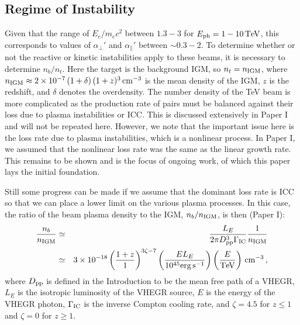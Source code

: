 \documentclass[usenatbib,iop,apj]{emulateapj}
\def\eV{{\rm eV}} %
\def\TeV{{\rm T}\eV} %
\def\erg{{\rm erg}} %
\def\cm{{\rm cm}}
\def\s{{\rm s}}
\def\GIC{\Gamma_{\rm IC}}
\def\Dpp{D_{\rm pp}}
\def\nb{n_{b}}
\def\nIGM{n_{\rm IGM}}
\begin{document}
\subsection{Regime of Instability}

Given that the range of $E_e/m_e c^2$ between $1.3-3$ for $E_{\rm ph} = 1-10\,\TeV$, this corresponds to values of $\alpha_{\perp}'$ and $\alpha_{\parallel}'$ between $\sim 0.3-2$.  To determine whether or not the reactive or kinetic instabilities apply to these beams, it is necessary to determine $n_b/n_t$.  Here the target is the background IGM, so $n_t = \nIGM$, where $\nIGM \approx 2\times 10^{-7}\,(1+\delta)\,(1+z)^3\,\cm^{-3}$ is the mean density of the IGM, $z$ is the redshift, and $\delta$ denotes the overdensity.  The number density of the TeV beam is more complicated as the production rate of pairs must be balanced against their loss due to plasma instabilities or ICC.  This is discussed extensively in Paper I and will not be repeated here.  However, we note that the important issue here is the loss rate due to plasma instabilities, which is a nonlinear process.  In Paper I, we assumed that the nonlinear loss rate was the same as the linear growth rate.  This remains to be shown and is the focus of ongoing work, of which this paper lays the initial foundation. 

Still some progress can be made if we assume that the dominant loss rate is ICC so that we can place a lower limit on the various plasma processes.  In this case, the ratio of the beam plasma density to the IGM, $n_b/\nIGM$, is then (Paper I):
\begin{eqnarray}
\frac{\nb}{\nIGM} &\simeq&
\frac{L_E}{2\pi\Dpp^3\GIC}\frac{1}{\nIGM} \nonumber\\
&\simeq &
3\times10^{-18}
\left(\frac{1+z}{1}\right)^{3\zeta-7}
\left(\frac{E L_E}{10^{45}\erg\,\s^{-1}}\right)
\left(\frac{E}{\TeV}\right)
\,\cm^{-3}\,,
\label{eq:nbIC}
\end{eqnarray}
where $\Dpp$ is defined in the Introduction to be the mean free path of a VHEGR, $L_E$ is the isotropic luminosity of the VHEGR source, $E$ is the energy of the VHEGR photon, $\Gamma_{\rm IC}$ is the inverse Compton cooling rate, and $\zeta = 4.5$ for $z \leq 1$ and $\zeta = 0$ for $z\geq 1$.
\end{document}
